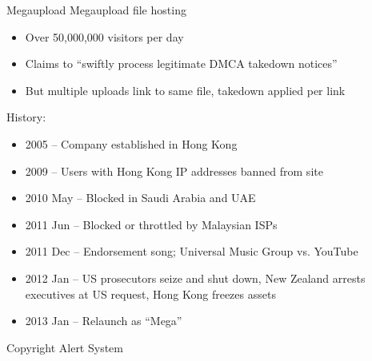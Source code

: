 \documentclass{beamer}
\begin{document}
\begin{frame}{Megaupload}
Megaupload file hosting
\begin{itemize}
\item Over 50,000,000 visitors per day
\item Claims to ``swiftly process legitimate DMCA takedown notices''
\item But multiple uploads link to same file, takedown applied per link
\end{itemize}
History:
\begin{itemize}
\item 2005 -- Company established in Hong Kong
\item 2009 -- Users with Hong Kong IP addresses banned from site
\item 2010 May -- Blocked in Saudi Arabia and UAE
\item 2011 Jun -- Blocked or throttled by Malaysian ISPs
\item 2011 Dec -- Endorsement song; Universal Music Group vs. YouTube
\item 2012 Jan -- US prosecutors seize and shut down, New Zealand arrests executives at US request, Hong Kong freezes assets
\item 2013 Jan -- Relaunch as ``Mega''
\end{itemize}
\end{frame}

\begin{frame}{Copyright Alert System}
\end{frame}
\end{document}
